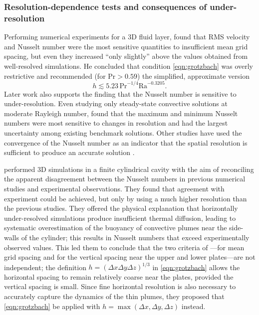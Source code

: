 \documentclass[titlepage,twoside]{article}
\numberwithin{equation}{section}
\newcommand{\prandtl}{\ensuremath{\mathrm{Pr}}}
\newcommand{\rayleigh}{\ensuremath{\mathrm{Ra}}}
\begin{document}
\subsubsection{
    Resolution-dependence tests and consequences of under-resolution}%
\label{sec:res_tests}

Performing numerical experiments for a 3D fluid layer,
\citeauthor{grotzbach1983} found that RMS velocity and Nusselt number were
the most sensitive quantities to insufficient mean grid spacing, but even
they increased ``only slightly'' above the values obtained from well-resolved
simulations. He concluded that condition \cref{eqn:grotzbach} was overly
restrictive and recommended (for $\prandtl > 0.59$) the simplified,
approximate version
\[ %
    h \lesssim 5.23 \, \prandtl^{-1/4} \rayleigh^{-0.3205}.
\]
Later work also supports the finding that the Nusselt number is
sensitive to under-resolution. Even studying only steady-state convective
solutions at moderate Rayleigh number, \textcite{le_quere1991} found that the
maximum and minimum Nusselt numbers were most sensitive to changes in
resolution and had the largest uncertainty among existing benchmark solutions.
Other studies have used the convergence of the Nusselt number as an indicator
that the spatial resolution is sufficient to produce an accurate solution
\parencite{ouertatani2008}.

\textcite{stevens2010} performed 3D simulations in a finite cylindrical cavity
with the aim of reconciling the apparent disagreement between the Nusselt
numbers in previous numerical studies and experimental observations. They found
that agreement with experiment could be achieved, but only by using a much
higher resolution than the previous studies. They offered the physical
explanation that horizontally under-resolved simulations produce insufficient
thermal diffusion, leading to systematic overestimation of the buoyancy of
convective plumes near the side-walls of the cylinder; this results in Nusselt
numbers that exceed experimentally observed values. This led them to conclude
that the two criteria of \textcite{grotzbach1983}---for mean grid spacing
and for the vertical spacing near the upper and lower plates---are not
independent; the definition $h = (\Delta x \Delta y \Delta z)^{1/3}$ in
\cref{eqn:grotzbach} allows the horizontal spacing to remain relatively
coarse near the plates, provided the vertical spacing is small. Since
fine horizontal resolution is also necessary to accurately capture
the dynamics of the thin plumes, they proposed that \cref{eqn:grotzbach} be
applied with $h = \max(\Delta x, \Delta y, \Delta z)$ instead.
\end{document}
